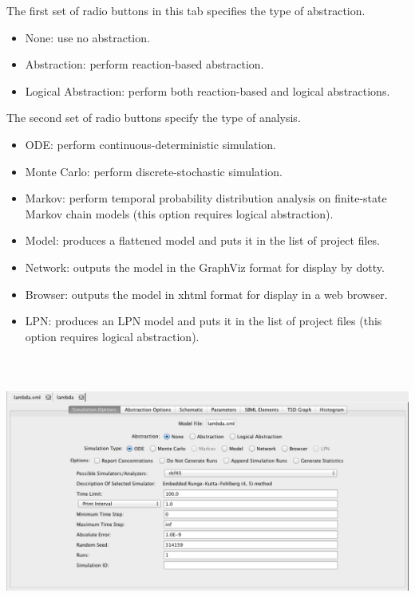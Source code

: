 \documentclass[titlepage,11pt]{article}
\begin{document}
\noindent
The first set of radio buttons in this tab specifies the type of abstraction. 
\begin{itemize}
\item None: use no abstraction.
\item Abstraction: perform reaction-based abstraction.
\item Logical Abstraction: perform both reaction-based and logical abstractions.
\end{itemize}
The second set of radio buttons specify the type of analysis.  
\begin{itemize}
\item ODE: perform continuous-deterministic simulation.
\item Monte Carlo: perform discrete-stochastic simulation.
\item Markov: perform temporal probability distribution analysis on finite-state Markov chain models (this option requires logical abstraction).
\item Model: produces a flattened model and puts it in the list of project files.
\item Network: outputs the model in the GraphViz format for display by dotty.
\item Browser: outputs the model in xhtml format for display in a web browser.
\item LPN: produces an LPN model and puts it in the list of project files (this option requires logical abstraction).  
\end{itemize}

\begin{center}
\includegraphics[height=90mm]{screenshots/analysisView}
\end{center}
 
\end{document}
